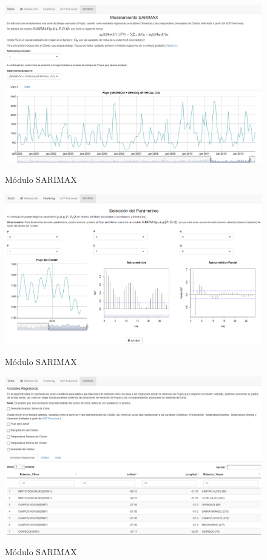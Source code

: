 \documentclass[12pt,oneside]{book}\usepackage[]{graphicx}\usepackage[]{color}
\theoremstyle{definition} %
\begin{document}
\begin{figure}[h]
\caption{Módulo SARIMAX}
\includegraphics[width=15cm]{Cap3-WebApp/modulo_sarimax1}
\label{fig:modulo_sarimax1}
\centering
\end{figure}

\begin{figure}[h]
\caption{Módulo SARIMAX}
\includegraphics[width=15cm]{Cap3-WebApp/modulo_sarimax2}
\label{fig:modulo_sarimax2}
\centering
\end{figure}

\begin{figure}[h]
\caption{Módulo SARIMAX}
\includegraphics[width=15cm]{Cap3-WebApp/modulo_sarimax3}
\label{fig:modulo_sarimax3}
\centering
\end{figure}
\end{document}
